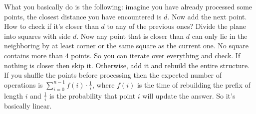 What you basically do is the following: imagine you have already processed some points, the closest distance you have encountered is $d$. Now add the next point. How to check if it's closer than $d$ to any of the previous ones? Divide the plane into squares with side $d$. Now any point that is closer than $d$ can only lie in the neighboring by at least corner or the same square as the current one. No square contains more than $4$ points. So you can iterate over everything and check. If nothing is closer then skip it. Otherwise, add it and rebuild the entire structure. If you shuffle the points before processing then the expected number of operations is $\sum_{i=0}^{n-1} f(i) \cdot \frac{1}{i}$, where $f(i)$ is the time of rebuilding the prefix of length $i$ and $\frac{1}{i}$ is the probability that point $i$ will update the answer. So it's basically linear.